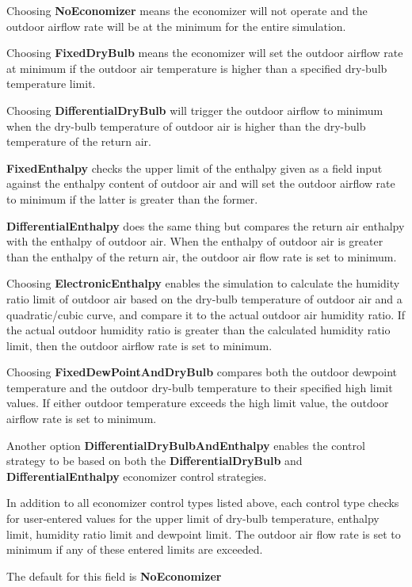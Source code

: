 Choosing \textbf{NoEconomizer} means the economizer will not operate and the outdoor airflow rate will be at the minimum for the entire simulation.

Choosing \textbf{FixedDryBulb} means the economizer will set the outdoor airflow rate at minimum if the outdoor air temperature is higher than a specified dry-bulb temperature limit.

Choosing \textbf{DifferentialDryBulb} will trigger the outdoor airflow to minimum when the dry-bulb temperature of outdoor air is higher than the dry-bulb temperature of the return air.

\textbf{FixedEnthalpy} checks the upper limit of the enthalpy given as a field input against the enthalpy content of outdoor air and will set the outdoor airflow rate to minimum if the latter is greater than the former.

\textbf{DifferentialEnthalpy} does the same thing but compares the return air enthalpy with the enthalpy of outdoor air. When the enthalpy of outdoor air is greater than the enthalpy of the return air, the outdoor air flow rate is set to minimum.

Choosing \textbf{ElectronicEnthalpy} enables the simulation to calculate the humidity ratio limit of outdoor air based on the dry-bulb temperature of outdoor air and a quadratic/cubic curve, and compare it to the actual outdoor air humidity ratio. If the actual outdoor humidity ratio is greater than the calculated humidity ratio limit, then the outdoor airflow rate is set to minimum.

Choosing \textbf{FixedDewPointAndDryBulb} compares both the outdoor dewpoint temperature and the outdoor dry-bulb temperature to their specified high limit values. If either outdoor temperature exceeds the high limit value, the outdoor airflow rate is set to minimum.

Another option \textbf{DifferentialDryBulbAndEnthalpy} enables the control strategy to be based on both the \textbf{DifferentialDryBulb} and \textbf{DifferentialEnthalpy} economizer control strategies.

In addition to all economizer control types listed above, each control type checks for user-entered values for the upper limit of dry-bulb temperature, enthalpy limit, humidity ratio limit and dewpoint limit. The outdoor air flow rate is set to minimum if any of these entered limits are exceeded.

The default for this field is \textbf{NoEconomizer}

